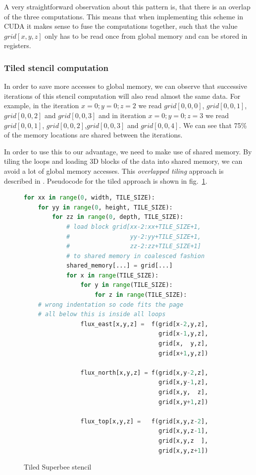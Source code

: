 \documentclass[a4paper,oneside]{memoir}
\begin{document}
A very straightforward observation about this pattern is, that there is an overlap of the three computations. This means that when implementing this scheme in CUDA it makes sense to fuse the computations together, such that the value $grid\left[x,y,z\right]$ only has to be read once from global memory and can be stored in registers.

\subsubsection{Tiled stencil computation}
\label{sec:tiled_stencil}
In order to save more accesses to global memory, we can observe that successive iterations of this stencil computation will also read almost the same data.
For example, in the iteration $x = 0 ; y = 0 ; z = 2$ we read $grid[0,0,0]$, $grid[0,0,1]$,$grid[0,0,2]$ and $grid[0,0,3]$ and in iteration $x = 0 ; y = 0 ; z = 3$
we read $grid[0,0,1]$, $grid[0,0,2]$,$grid[0,0,3]$ and $grid[0,0,4]$. We can see that 75\% of the memory locations are shared between the iterations.

In order to use this to our advantage, we need to make use of shared memory.
By tiling the loops and loading 3D blocks of the data into shared memory, we can avoid a lot of global memory accesses. This \emph{overlapped tiling} approach is described in \cite{stencil_lift}.
Pseudocode for the tiled approach is shown in fig.~\ref{fig:stencil_tiled}.

\begin{figure}[hbtp]
    \caption{Tiled Superbee stencil}
    \label{fig:stencil_tiled}
    \begin{lstlisting}[language=python,frame=single]
for xx in range(0, width, TILE_SIZE):
    for yy in range(0, height, TILE_SIZE):
        for zz in range(0, depth, TILE_SIZE):
            # load block grid[xx-2:xx+TILE_SIZE+1, 
            #                 yy-2:yy+TILE_SIZE+1,
            #                 zz-2:zz+TILE_SIZE+1]
            # to shared memory in coalesced fashion
            shared_memory[...] = grid[...]
            for x in range(TILE_SIZE):
                for y in range(TILE_SIZE):
                    for z in range(TILE_SIZE):
    # wrong indentation so code fits the page
    # all below this is inside all loops     
                flux_east[x,y,z] =  f(grid[x-2,y,z], 
                                      grid[x-1,y,z],
                                      grid[x,  y,z],
                                      grid[x+1,y,z])

                flux_north[x,y,z] = f(grid[x,y-2,z], 
                                      grid[x,y-1,z],
                                      grid[x,y,  z],
                                      grid[x,y+1,z])

                flux_top[x,y,z] =   f(grid[x,y,z-2], 
                                      grid[x,y,z-1],
                                      grid[x,y,z  ],
                                      grid[x,y,z+1])
    \end{lstlisting}
\end{figure}
\end{document}
